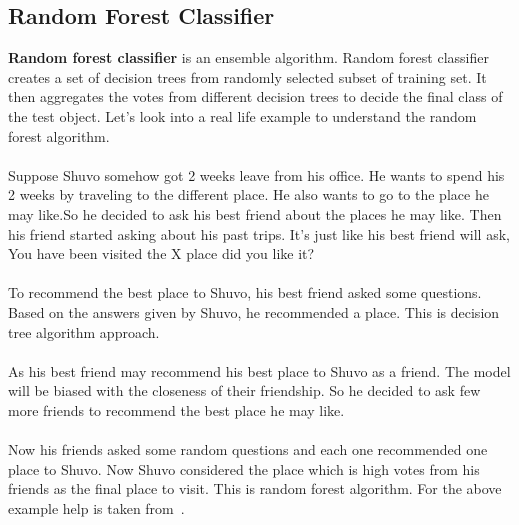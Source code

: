 \documentclass[10pt,a4paper]{article}
\begin{document}
\subsection{Random Forest Classifier}
\textbf{Random forest classifier} is an ensemble algorithm. Random forest classifier creates a set of decision trees from randomly selected subset of training set. It then aggregates the votes from different decision trees to decide the final class of the test object. Let’s look into a real life example to understand the random forest algorithm.\\\\
Suppose Shuvo somehow got 2 weeks leave from his office. He wants to spend his 2 weeks by traveling to the different place. He also wants to go to the place he may like.So he decided to ask his best friend about the places he may like. Then his friend started asking about his past trips. It’s just like his best friend will ask, You have been visited the X place did you like it?\\\\
To recommend the best place to Shuvo, his best friend asked some questions. Based on the answers given by Shuvo, he recommended a place. This is decision tree algorithm approach.\\\\
As his best friend may recommend his best place to Shuvo as a friend. The model will be biased with the closeness of their friendship. So he decided to ask few more friends to recommend the best place he may like.\\\\
Now his friends asked some random questions and each one recommended one place to Shuvo. Now  Shuvo considered the place which is high votes from his friends as the final place to visit. This is random forest algorithm.
For the above example help is taken from~\cite{c}.
\end{document}
